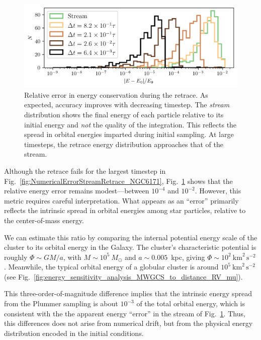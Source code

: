         \begin{figure}
            \centering
            \includegraphics[width=\linewidth]{images/NumericalErrorStreamRetrace_EnergyErrors.png}
            \caption{Relative error in energy conservation during the retrace. As expected, accuracy improves with decreasing timestep. The \textit{stream} distribution shows the final energy of each particle relative to its initial energy and \textit{not} the quality of the integration. This reflects the spread in orbital energies imparted during initial sampling. At large timesteps, the retrace energy distribution approaches that of the stream.}
            \label{fig:NumericalErrorStreamRetrace_EnergyErrors}
        \end{figure}

        Although the retrace fails for the largest timestep in Fig.~\ref{fig:NumericalErrorStreamRetrace_NGC6171}, Fig.~\ref{fig:NumericalErrorStreamRetrace_EnergyErrors} shows that the relative energy error remains modest—between $10^{-4}$ and $10^{-2}$. However, this metric requires careful interpretation. What appears as an ``error'' primarily reflects the intrinsic spread in orbital energies among star particles, relative to the center-of-mass energy. 

        We can estimate this ratio by comparing the internal potential energy scale of the cluster to its orbital energy in the Galaxy. The cluster's characteristic potential is roughly $\Phi \sim GM/a$, with $M \sim 10^5~M_\odot$ and $a \sim 0.005$~kpc, giving $\Phi \sim 10^2~\mathrm{km}^2\,\mathrm{s}^{-2}$. Meanwhile, the typical orbital energy of a globular cluster is around $10^5~\mathrm{km}^2\,\mathrm{s}^{-2}$ (see Fig.~\ref{fig:energy_sensitivity_analysis_MWGCS_to_distance_RV_mu}). 

        This three-order-of-magnitude difference implies that the intrinsic energy spread from the Plummer sampling is about $10^{-3}$ of the total orbital energy, which is consistent with the the apparent energy ``error'' in the stream of Fig.~\ref{fig:NumericalErrorStreamRetrace_EnergyErrors}. Thus, this differences does not arise from numerical drift, but from the physical energy distribution encoded in the initial conditions. 

